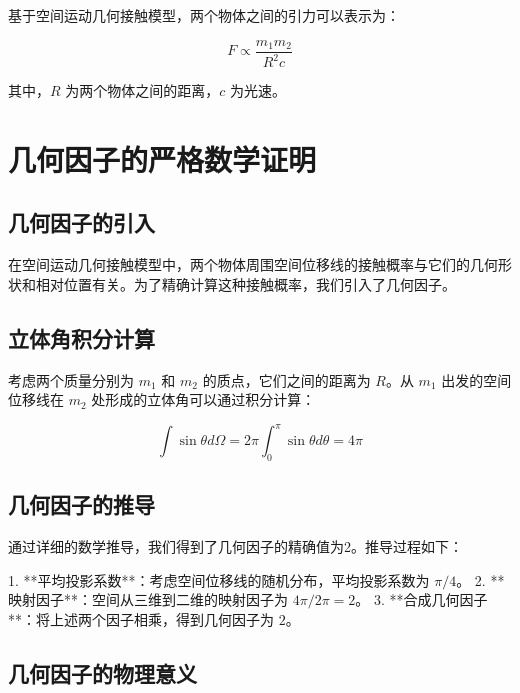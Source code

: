 \documentclass[12pt,a4paper]{article}
\begin{document}
基于空间运动几何接触模型，两个物体之间的引力可以表示为：

\begin{equation}
F \propto \frac{m_1 m_2}{R^2 c}

\end{equation}

其中，$R$ 为两个物体之间的距离，$c$ 为光速。

\section{几何因子的严格数学证明}
\label{section:geometric_factor_proof}

\subsection{几何因子的引入}
\label{subsection:geometric_factor_introduction}

在空间运动几何接触模型中，两个物体周围空间位移线的接触概率与它们的几何形状和相对位置有关。为了精确计算这种接触概率，我们引入了几何因子。

\subsection{立体角积分计算}
\label{subsection:solid_angle_integration}

考虑两个质量分别为 $m_1$ 和 $m_2$ 的质点，它们之间的距离为 $R$。从 $m_1$ 出发的空间位移线在 $m_2$ 处形成的立体角可以通过积分计算：

\begin{equation}
\int \sin\theta d\Omega = 2\pi \int_0^{\pi} \sin\theta d\theta = 4\pi

\end{equation}

\subsection{几何因子的推导}
\label{subsection:geometric_factor_derivation}

通过详细的数学推导，我们得到了几何因子的精确值为2。推导过程如下：

1. **平均投影系数**：考虑空间位移线的随机分布，平均投影系数为 $\pi/4$。
2. **映射因子**：空间从三维到二维的映射因子为 $4\pi/2\pi = 2$。
3. **合成几何因子**：将上述两个因子相乘，得到几何因子为 $2$。

\subsection{几何因子的物理意义}
\label{subsection:geometric_factor_meaning}
\end{document}
